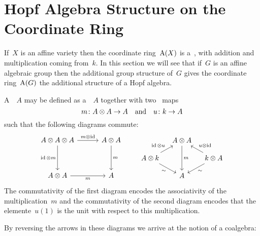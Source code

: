 \section{Hopf Algebra Structure on the Coordinate Ring}


\begin{fluff}
  If~$X$ is an affine variety then the coordinate ring~$\operatorname{A}(X)$ is a~, with addition and multiplication coming from~$k$.
  In this section we will see that if~$G$ is an affine algebraic group then the additional group structure of~$G$ gives the coordinate ring~$\operatorname{A}(G)$ the additional structure of a Hopf algebra. 
\end{fluff}


\begin{fluff}
  A~~$A$ may be defined as a~~$A$ together with two~ maps
  \[
    m \colon A \mathbin{\otimes} A \to A
    \quad\text{and}\quad
    u \colon k \to A
  \]
  such that the following diagrams commute:
  \[
    \begin{tikzcd}[column sep = 30pt, row sep = 35pt]
        A \tensor A \tensor A
        \arrow{r}[above]{m \tensor \id}
        \arrow{d}[left]{\id \tensor m}
      & A \tensor A
        \arrow{d}[right]{m}
      \\
        A \tensor A
        \arrow{r}[below]{m}
      & A
    \end{tikzcd}
    \quad\quad
    \begin{tikzcd}[column sep = 10pt, row sep = 10pt]
        {}
      & A \tensor A
        \arrow{dd}[right]{m}
      & {}
      \\
        A \tensor k
        \arrow{ur}{\id \tensor u}
        \arrow{dr}[below left]{\sim}
      & {}
      & k \tensor A
        \arrow{ul}[above right]{u \tensor \id}
        \arrow{dl}[below right]{\sim}
      \\
        {}
      & A
      & {}
    \end{tikzcd}
  \]
  The commutativity of the first diagram encodes the associativity of the multiplication~$m$ and the commutativity of the second diagram encodes that the elemente~$u(1)$ is the unit with respect to this multiplication.
  
  By reversing the arrows in these diagrams we arrive at the notion of a coalgebra:
\end{fluff}



